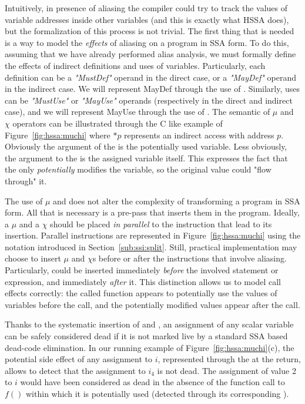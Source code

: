 Intuitively, in presence of aliasing the compiler could try to track the values of variable addresses inside other variables (and this is exactly what HSSA does), but the formalization of this process is not trivial.
The first thing that is needed is a way to model the {\em effects} of aliasing on a program in SSA form.
To do this, assuming that we have already performed alias analysis, we must formally define the effects of indirect definitions and uses of variables.
Particularly, each definition can be a {\em "MustDef"} operand in the direct case, or a {\em "MayDef"} operand in the indirect case. We will represent MayDef through the use of \chifuns.
Similarly, uses can be {\em "MustUse"} or {\em "MayUse"} operands (respectively in the direct and indirect case), and we will represent MayUse  through the use of \mufuns.
The semantic of $\mu$ and $\chi$ operators can be illustrated through the C like example of Figure~\ref{fig:hssa:muchi} where $*p$ represents an indirect access with address $p$.
Obviously the argument of the \muop is the potentially used variable.
Less obviously, the argument to the \chiop is the assigned variable itself. This expresses the fact that the \chiop only {\em potentially} modifies the variable, so the original value could "flow through" it. 

The use of $\mu$ and \chiops does not alter the complexity of transforming a program in SSA form. All that is necessary is a pre-pass that inserts them in the program. Ideally, a $\mu$ and a $\chi$ should be placed \emph{in parallel} to the instruction that lead to its insertion. Parallel instructions are represented in Figure~\ref{fig:hssa:muchi} using the notation introduced in Section~\ref{sub:ssi:split}. Still, practical implementation may choose to insert $\mu$ and $\chi$s before or after the instructions that involve aliasing. Particularly, \mufuns could be inserted immediately {\em before} the involved statement or expression, and \chiops immediately {\em after} it. This distinction allows us to model call effects correctly: the called function appears to potentially use the values of variables before the call, and the potentially modified values appear after the call.

Thanks to the systematic insertion of \mufuns and \chifuns, an assignment of any scalar variable can be safely considered dead if it is not marked live by a standard SSA based dead-code elimination. In our running example of Figure~\ref{fig:hssa:muchi}(c), the potential side effect of any assignment to $i$, represented through the \mufun at the return, allows to detect that the assignment to $i_4$ is not dead. The assignment of value 2 to $i$ would have been considered as dead in the absence of the function call to $f()$ within which it is potentially used (detected through its corresponding \mufun). 




